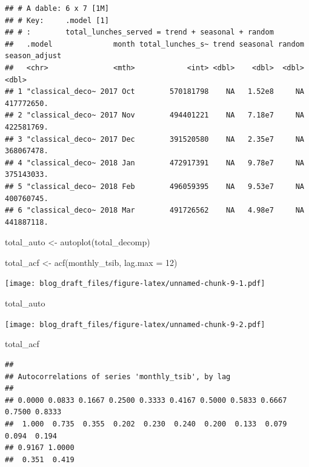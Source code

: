 \documentclass[
]{article}
\newenvironment{Shaded}{\begin{snugshade}}{\end{snugshade}}
\newcommand{\AttributeTok}[1]{\textcolor[rgb]{0.77,0.63,0.00}{#1}}
\newcommand{\DecValTok}[1]{\textcolor[rgb]{0.00,0.00,0.81}{#1}}
\newcommand{\FunctionTok}[1]{\textcolor[rgb]{0.00,0.00,0.00}{#1}}
\newcommand{\NormalTok}[1]{#1}
\newcommand{\OtherTok}[1]{\textcolor[rgb]{0.56,0.35,0.01}{#1}}
\begin{document}
\begin{verbatim}
## # A dable: 6 x 7 [1M]
## # Key:     .model [1]
## # :        total_lunches_served = trend + seasonal + random
##   .model              month total_lunches_s~ trend seasonal random season_adjust
##   <chr>               <mth>            <int> <dbl>    <dbl>  <dbl>         <dbl>
## 1 "classical_deco~ 2017 Oct        570181798    NA   1.52e8     NA    417772650.
## 2 "classical_deco~ 2017 Nov        494401221    NA   7.18e7     NA    422581769.
## 3 "classical_deco~ 2017 Dec        391520580    NA   2.35e7     NA    368067478.
## 4 "classical_deco~ 2018 Jan        472917391    NA   9.78e7     NA    375143033.
## 5 "classical_deco~ 2018 Feb        496059395    NA   9.53e7     NA    400760745.
## 6 "classical_deco~ 2018 Mar        491726562    NA   4.98e7     NA    441887118.
\end{verbatim}

\begin{Shaded}
\begin{Highlighting}[]
\NormalTok{total\_auto }\OtherTok{\textless{}{-}} \FunctionTok{autoplot}\NormalTok{(total\_decomp)}
\end{Highlighting}
\end{Shaded}

\begin{Shaded}
\begin{Highlighting}[]
\NormalTok{total\_acf }\OtherTok{\textless{}{-}} \FunctionTok{acf}\NormalTok{(monthly\_tsib, }\AttributeTok{lag.max =} \DecValTok{12}\NormalTok{)}
\end{Highlighting}
\end{Shaded}

\texttt{[image: blog\_draft\_files/figure-latex/unnamed-chunk-9-1.pdf]}

\begin{Shaded}
\begin{Highlighting}[]
\NormalTok{total\_auto }
\end{Highlighting}
\end{Shaded}

\texttt{[image: blog\_draft\_files/figure-latex/unnamed-chunk-9-2.pdf]}

\begin{Shaded}
\begin{Highlighting}[]
\NormalTok{total\_acf}
\end{Highlighting}
\end{Shaded}

\begin{verbatim}
## 
## Autocorrelations of series 'monthly_tsib', by lag
## 
## 0.0000 0.0833 0.1667 0.2500 0.3333 0.4167 0.5000 0.5833 0.6667 0.7500 0.8333 
##  1.000  0.735  0.355  0.202  0.230  0.240  0.200  0.133  0.079  0.094  0.194 
## 0.9167 1.0000 
##  0.351  0.419
\end{verbatim}
\end{document}
